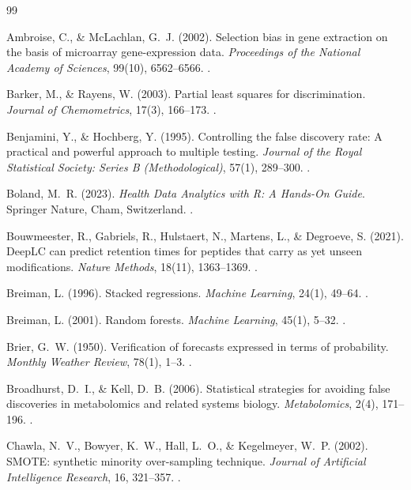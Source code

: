 \documentclass[11pt,oneside]{book}
\begin{document}
\begin{thebibliography}{99}

Ambroise, C., \& McLachlan, G.~J. (2002). Selection bias in gene extraction on the basis of microarray gene-expression data. \textit{Proceedings of the National Academy of Sciences}, 99(10), 6562--6566. .

Barker, M., \& Rayens, W. (2003). Partial least squares for discrimination. \textit{Journal of Chemometrics}, 17(3), 166--173. .

Benjamini, Y., \& Hochberg, Y. (1995). Controlling the false discovery rate: A practical and powerful approach to multiple testing. \textit{Journal of the Royal Statistical Society: Series B (Methodological)}, 57(1), 289--300. .

Boland, M.~R. (2023). \textit{Health Data Analytics with R: A Hands-On Guide}. Springer Nature, Cham, Switzerland. .

Bouwmeester, R., Gabriels, R., Hulstaert, N., Martens, L., \& Degroeve, S. (2021). DeepLC can predict retention times for peptides that carry as yet unseen modifications. \textit{Nature Methods}, 18(11), 1363--1369. .

Breiman, L. (1996). Stacked regressions. \textit{Machine Learning}, 24(1), 49--64. .

Breiman, L. (2001). Random forests. \textit{Machine Learning}, 45(1), 5--32. .

Brier, G.~W. (1950). Verification of forecasts expressed in terms of probability. \textit{Monthly Weather Review}, 78(1), 1--3. .

Broadhurst, D.~I., \& Kell, D.~B. (2006). Statistical strategies for avoiding false discoveries in metabolomics and related systems biology. \textit{Metabolomics}, 2(4), 171--196. .

Chawla, N.~V., Bowyer, K.~W., Hall, L.~O., \& Kegelmeyer, W.~P. (2002). SMOTE: synthetic minority over-sampling technique. \textit{Journal of Artificial Intelligence Research}, 16, 321--357. .


\end{thebibliography}
\end{document}
